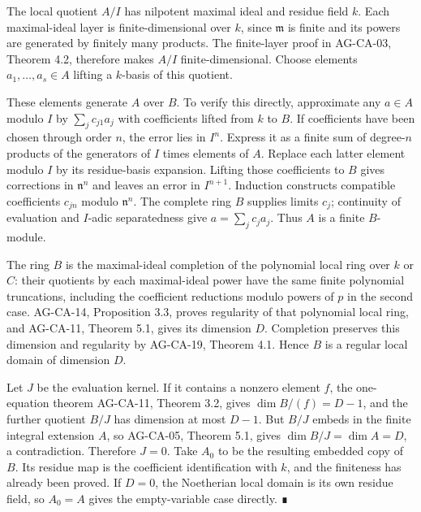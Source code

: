 \documentclass[11pt,a4paper,openany]{report}
\begin{document}
The local quotient \(A/I\) has nilpotent maximal ideal and residue field \(k\). Each maximal-ideal layer is finite-dimensional over \(k\), since \(\mathfrak m\) is finite and its powers are generated by finitely many products. The finite-layer proof in AG-CA-03, Theorem 4.2, therefore makes \(A/I\) finite-dimensional. Choose elements \(a_1,\ldots,a_s\in A\) lifting a \(k\)-basis of this quotient.

These elements generate \(A\) over \(B\). To verify this directly, approximate any \(a\in A\) modulo \(I\) by \(\sum_jc_{j1}a_j\) with coefficients lifted from \(k\) to \(B\). If coefficients have been chosen through order \(n\), the error lies in \(I^n\). Express it as a finite sum of degree-\(n\) products of the generators of \(I\) times elements of \(A\). Replace each latter element modulo \(I\) by its residue-basis expansion. Lifting those coefficients to \(B\) gives corrections in \(\mathfrak n^n\) and leaves an error in \(I^{n+1}\). Induction constructs compatible coefficients \(c_{jn}\) modulo \(\mathfrak n^n\). The complete ring \(B\) supplies limits \(c_j\); continuity of evaluation and \(I\)-adic separatedness give \(a=\sum_jc_ja_j\). Thus \(A\) is a finite \(B\)-module.

The ring \(B\) is the maximal-ideal completion of the polynomial local ring over \(k\) or \(C\): their quotients by each maximal-ideal power have the same finite polynomial truncations, including the coefficient reductions modulo powers of \(p\) in the second case. AG-CA-14, Proposition 3.3, proves regularity of that polynomial local ring, and AG-CA-11, Theorem 5.1, gives its dimension \(D\). Completion preserves this dimension and regularity by AG-CA-19, Theorem 4.1. Hence \(B\) is a regular local domain of dimension \(D\).

Let \(J\) be the evaluation kernel. If it contains a nonzero element \(f\), the one-equation theorem AG-CA-11, Theorem 3.2, gives \(\dim B/(f)=D-1\), and the further quotient \(B/J\) has dimension at most \(D-1\). But \(B/J\) embeds in the finite integral extension \(A\), so AG-CA-05, Theorem 5.1, gives \(\dim B/J=\dim A=D\), a contradiction. Therefore \(J=0\). Take \(A_0\) to be the resulting embedded copy of \(B\). Its residue map is the coefficient identification with \(k\), and the finiteness has already been proved. If \(D=0\), the Noetherian local domain is its own residue field, so \(A_0=A\) gives the empty-variable case directly. ∎

\label{AG-RG-S05-algebra-lemma-completion-at-quasi-finite-prime}
\end{document}
